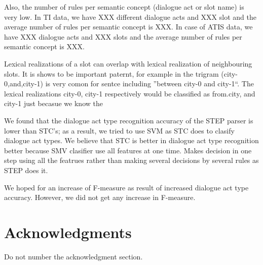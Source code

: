\documentclass[11pt]{article}
\begin{document}
Also, the number of rules per semantic concept (dialogue act or slot name) is very low. In TI data, we have XXX different dialogue acts and XXX slot and the average number of rules per semantic concept is XXX. In case of ATIS data, we have XXX dialogue acts and XXX slots and the average number of rules per semantic concept is XXX.

Lexical realizations of a slot can overlap with lexical realization of neighbouring slots. It is shows to be important paternt, for example in the trigram (city-0,and,city-1) is very comon for sentce including ''between city-0 and city-1``. The lexical realizations city-0, city-1 respectively would be classified as from.city, and city-1 just becasue we know the  


We found that the dialogue act type recognition accuracy of the STEP parser is lower than STC's; as a result, we tried to use SVM as STC does to clasify dialogue act types. We believe that STC is better in dialogue act type recognition better because SMV clasifier use all features at one time. Makes decision in one step using all the featrues rather than making several decisions by several rules as STEP does it.

We hoped for an increase of F-measure as result of increased dialogue act type accuracy. However, we did not get any increase in F-measure.
 
\section*{Acknowledgments}

Do not number the acknowledgment section.
\end{document}
